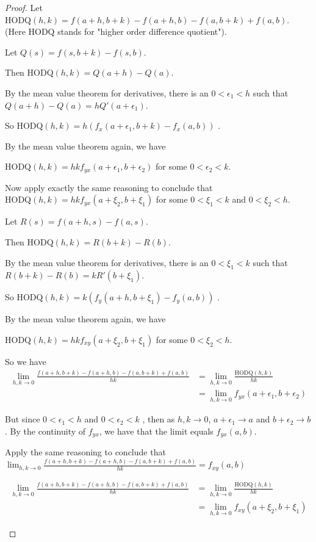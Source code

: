\documentclass{ximera}
\begin{document}
	\begin{proof}
		Let $\textrm{HODQ}(h,k) = f(a+h,b+k)-f(a+h,b)-f(a,b+k)+f(a,b)$.  (Here $\textrm{HODQ}$ stands for "higher order difference quotient").
		
		Let $Q(s) = f(s,b+k) - f(s,b)$.
		
		Then $\textrm{HODQ}(h,k) = Q(a+h) - Q(a)$.
		
		By the mean value theorem for derivatives, there is an $0<\epsilon_1 < h$ such that 
		$Q(a+h)-Q(a) = hQ'(a+\epsilon_1)$.
		
		So $\textrm{HODQ}(h,k) = h( f_{x}(a+\epsilon_1,b+k) -f_x(a,b))$ .
		
		By the mean value theorem again, we have
		
		$\textrm{HODQ}(h,k) = hkf_{yx}(a+\epsilon_1,b+\epsilon_2)$ for some $0<\epsilon_2<k$.
		
		Now apply exactly the same reasoning to conclude that $\textrm{HODQ}(h,k) = hkf_{yx}(a+\xi_2,b+\xi_1)$ for some $0<\xi_1<k$ and $0<\xi_2<h$.
		\begin{free-response}
		
		Let $R(s) = f(a+h,s) - f(a,s)$.
		
		Then $\textrm{HODQ}(h,k) = R(b+k) - R(b)$.
		
		By the mean value theorem for derivatives, there is an $0<\xi_1 < k$ such that 
		$ R(b+k) - R(b) = kR'(b+\xi_1)$.
		
		So $\textrm{HODQ}(h,k) = k( f_y(a+h,b+\xi_1) -f_y(a,b))$ .
		
		By the mean value theorem again, we have
		
		$\textrm{HODQ}(h,k) = hkf_{xy}(a+\xi_2,b+\xi_1)$ for some $0<\xi_2<h$.
			
		\end{free-response}
		
		So we have 
		\begin{align*}
			\displaystyle\lim_{h,k \to 0} \frac{f(a+h,b+k)-f(a+h,b)-f(a,b+k)+f(a,b)}{hk} &= \displaystyle\lim_{h,k \to 0} \frac{\textrm{HODQ}(h,k)}{hk}\\
				&= \displaystyle\lim_{h,k \to 0} f_{yx}( a+\epsilon_1,b+\epsilon_2) 
		\end{align*}
		
		But since $0<\epsilon_1 < h$ and $0<\epsilon_2<k$ , then as $h,k \to 0$, $a+\epsilon_1 \to a$ and $b+\epsilon_2 \to b$.  By the continuity of $f_{yx}$, we have that 
		the limit equals $f_{yx}(a,b)$.
		
		Apply the same reasoning to conclude that $\displaystyle\lim_{h,k \to 0} \frac{f(a+h,b+k)-f(a+h,b)-f(a,b+k)+f(a,b)}{hk} = f_{xy}(a,b)$
		\begin{free-response}
		\begin{align*}
			\displaystyle\lim_{h,k \to 0} \frac{f(a+h,b+k)-f(a+h,b)-f(a,b+k)+f(a,b)}{hk} &= \displaystyle\lim_{h,k \to 0} \frac{\textrm{HODQ}(h,k)}{hk}\\
				&= \displaystyle\lim_{h,k \to 0} f_{xy}( a+\xi_2,b+\xi_1) 
		\end{align*}
		

\end{free-response}
\end{proof}
\end{document}
